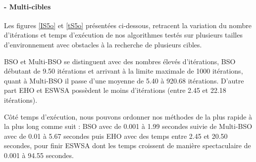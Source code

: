 	\noindent
	\paragraph{- Multi-cibles}
	\textbf{ }
	
	Les figures \ref{IS5o} et \ref{tS5o} présentées ci-dessous, retracent la variation du nombre d'itérations et temps d'exécution de nos algorithmes testés sur plusieurs tailles d'environnement avec obstacles à la recherche de plusieurs cibles.\\
	\vspace{-0.2cm}
	
	BSO et Multi-BSO se distinguent avec des nombres élevés d'itérations, BSO débutant de 9.50 itérations et arrivant à la limite maximale de 1000 itérations, quant à Multi-BSO il passe d'une moyenne de 5.40 à 920.68 itérations. D'autre part EHO et ESWSA possèdent le moins d'itérations (entre 2.45 et 22.18 itérations).\\
	\vspace{-0.2cm}	
	
	Côté temps d'exécution, nous pouvons ordonner nos méthodes de la plus rapide à la plus long comme suit : BSO avec de 0.001 à 1.99 secondes suivie de Multi-BSO avec de 0.01 à 5.67 secondes puis EHO avec des temps entre 2.45 et 20.50 secondes, pour finir ESWSA dont les temps croissent de manière spectaculaire de 0.001 à 94.55 secondes. 
	
	
	
	\noindent
	\hspace{-0.5cm}
	\begin{minipage}[t]{0.55\textwidth}
		\captionsetup{width=0.8\linewidth}
		\centering{}
		\label{IS5o}
	\end{minipage}\hfill
	\hspace{-0.5cm}
	\begin{minipage}[t]{0.55\textwidth}
		\captionsetup{width=0.8\linewidth}
		\centering{}
		\label{tS5o}
	\end{minipage}\hfill
	
	
	
